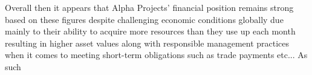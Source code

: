 Overall then it appears that Alpha Projects' financial position remains strong based on these figures despite challenging economic conditions globally due mainly to their ability to acquire more resources than they use up each month resulting in higher asset values along with responsible management practices when it comes to meeting short-term obligations such as trade payments etc... As such
